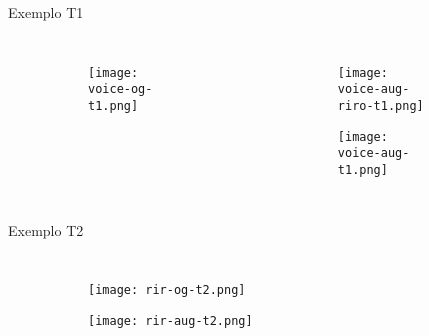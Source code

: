 \begin{frame}{Exemplo T1}
    \begin{columns}
        \begin{figure}
            \begin{subfigure}{\textwidth}
                \centering
                \texttt{[image: voice-og-t1.png]}
            \end{subfigure}
        \end{figure}

        \begin{figure}
            \begin{subfigure}{\textwidth}
                \centering
                \texttt{[image: voice-aug-riro-t1.png]}
            \end{subfigure}
            \begin{subfigure}{\textwidth}
                \centering
                \texttt{[image: voice-aug-t1.png]}
            \end{subfigure}
        \end{figure}
    \end{columns}
\end{frame}

\begin{frame}{Exemplo T2}
    \begin{columns}
        \begin{figure}
            \begin{subfigure}{\textwidth}
                \centering
                \texttt{[image: rir-og-t2.png]}
            \end{subfigure}
            \begin{subfigure}{\textwidth}
                \centering
                \texttt{[image: rir-aug-t2.png]}
            \end{subfigure}
        \end{figure}
    \end{columns}
        
\end{frame}

